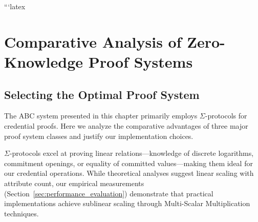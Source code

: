 ```latex
\section{Comparative Analysis of Zero-Knowledge Proof Systems}

\subsection{Selecting the Optimal Proof System}

The ABC system presented in this chapter primarily employs $\Sigma$-protocols for credential proofs. Here we analyze the comparative advantages of three major proof system classes and justify our implementation choices.

$\Sigma$-protocols excel at proving linear relations—knowledge of discrete logarithms, commitment openings, or equality of committed values—making them ideal for our credential operations. While theoretical analyses suggest linear scaling with attribute count, our empirical measurements (Section~\ref{sec:performance_evaluation}) demonstrate that practical implementations achieve sublinear scaling through Multi-Scalar Multiplication techniques.

